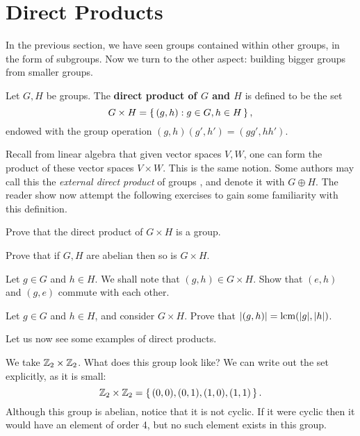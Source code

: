 \documentclass[./main.tex]{subfiles}
\begin{document}
\section{Direct Products}

In the previous section, we have seen groups contained within other groups, in
the form of subgroups. Now we turn to the other aspect: building bigger groups
from smaller groups. 

\begin{definition}
\label{def:direct-product}
    Let $G, H$ be groups. The \textbf{direct product of $G$ and $H$} is defined to be 
    the set 
    \[
        G \times H = \set{(g,h) : g \in G, h \in H},
    \]
    endowed with the group operation $(g,h)(g',h') = (gg', hh')$.
\end{definition}
Recall from linear algebra that given vector spaces $V, W$, one can form the
product of these vector spaces $V \times W$. This is the same notion. Some
authors may call this the \emph{external direct product} of groups
\autocite[Ch~8]{Gallian_2020}, and denote it with $G \oplus H$. The reader show
now attempt the following exercises to gain some familiarity with this
definition.

\begin{exercise}
    Prove that the direct product of $G \times H$ is a group.
\end{exercise}
\begin{exercise}
    Prove that if $G, H$ are abelian then so is $G \times H$.
\end{exercise}
\begin{exercise}
    Let $g \in G$ and $h \in H$. We shall note that $(g,h) \in G \times H$. Show
    that $(e, h)$ and $(g, e)$ commute with each other. 
\end{exercise}

\begin{exercise}
    Let $g \in G$ and $h \in H$, and consider $G \times H$. Prove that
    $\abs{(g,h)} = \operatorname{lcm}(\abs g, \abs h)$. 
\end{exercise}

Let us now see some examples of direct products.

\begin{example}
    We take $\mathbb{Z}_2 \times \mathbb{Z}_2$. What does this group look like? We can 
    write out the set explicitly, as it is small: 
    \[
        \mathbb{Z}_2 \times \mathbb{Z}_2 = \set{(0,0), (0,1), (1,0), (1,1)}.
    \]
    Although this group is abelian, notice that it is not cyclic. If it were
    cyclic then it would have an element of order 4, but no such element exists
    in this group.
\end{example}
\end{document}
